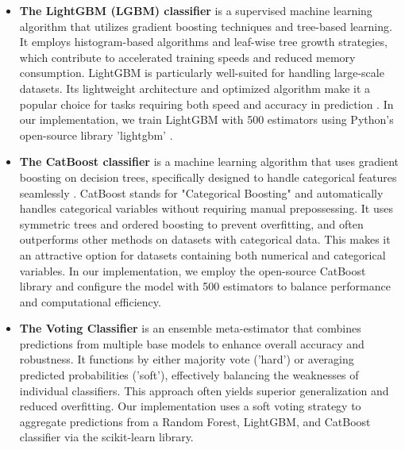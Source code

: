 \documentclass[gmd, manuscript]{copernicus}
\begin{document}
\begin{itemize}
    \item  \textbf{The LightGBM (LGBM) classifier} is a supervised machine learning algorithm that utilizes gradient boosting techniques and tree-based learning. It employs histogram-based algorithms and leaf-wise tree growth strategies, which contribute to accelerated training speeds and reduced memory consumption. 
    LightGBM is particularly well-suited for handling large-scale datasets. Its lightweight architecture and optimized algorithm make it a popular choice for tasks requiring both speed and accuracy in prediction \citep{ke2017lightgbm}.  In our implementation, we train LightGBM with 500 estimators using Python's open-source library 'lightgbm' \citep{van2007python}.
    \item  \textbf{The CatBoost classifier}  is a machine learning algorithm that uses gradient boosting on decision trees, specifically designed to handle categorical features seamlessly \cite{prokhorenkova2018catboost}. CatBoost stands for "Categorical Boosting" and automatically handles categorical variables  without requiring manual prepossessing. It uses symmetric trees and ordered boosting to prevent overfitting, and often outperforms other methods on datasets with categorical data.
    This  makes it an attractive option for datasets containing both numerical and categorical variables. In our implementation, we employ the open-source CatBoost library and configure the model with 500 estimators to balance performance and computational efficiency.
\item \textbf{The Voting Classifier} is an ensemble meta-estimator that combines predictions from multiple base models to enhance overall accuracy and robustness. It functions by either majority vote ('hard') or averaging predicted probabilities ('soft'), effectively balancing the weaknesses of individual classifiers. This approach often yields superior generalization and reduced overfitting. Our implementation uses a soft voting strategy to aggregate predictions from a Random Forest, LightGBM, and CatBoost classifier via the scikit-learn library. \citep{scikit-learn}
\end{itemize}
\end{document}
